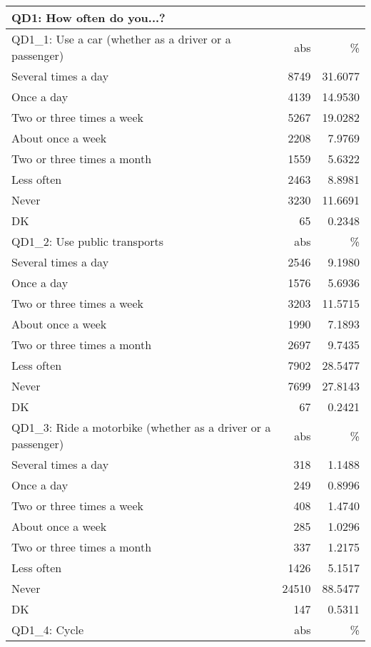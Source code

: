 \begin{table}[h]
	\begin{tabularx}{\textwidth} { b{12cm} | r | r}
QD1: How often do you...? \\ \hline
QD1\_1: Use a car (whether as a driver or a passenger) & abs & \% \\ \hline
Several times a day          &   8749 & 31.6077 \\
Once a day                   &   4139 & 14.9530 \\
Two or three times a week    &   5267 & 19.0282 \\
About once a week            &   2208 &  7.9769 \\
Two or three times a month   &   1559 &  5.6322 \\
Less often                   &   2463 &  8.8981 \\
Never                        &   3230 & 11.6691 \\
DK                           &     65 &  0.2348 \\ \hline
QD1\_2: Use public transports & abs & \% \\ \hline

Several times a day          &   2546 &  9.1980 \\
Once a day                   &   1576 &  5.6936 \\
Two or three times a week    &   3203 & 11.5715 \\
About once a week            &   1990 &  7.1893 \\
Two or three times a month   &   2697 &  9.7435 \\
Less often                   &   7902 & 28.5477 \\
Never                        &   7699 & 27.8143 \\
DK                           &     67 &  0.2421 \\ \hline
QD1\_3: Ride a motorbike (whether as a driver or a passenger) & abs & \% \\ \hline

Several times a day          &    318 &  1.1488 \\
Once a day                   &    249 &  0.8996 \\
Two or three times a week    &    408 &  1.4740 \\
About once a week            &    285 &  1.0296 \\
Two or three times a month   &    337 &  1.2175 \\
Less often                   &   1426 &  5.1517 \\
Never                        &  24510 & 88.5477 \\
DK                           &    147 &  0.5311 \\ \hline
QD1\_4: Cycle & abs & \% \\ \hline


\end{tabularx}
\end{table}
